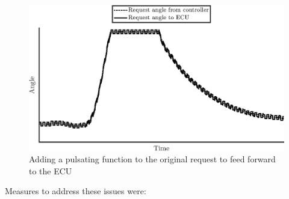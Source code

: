 \documentclass[root.tex]{subfiles}
\begin{document}
\begin{figure}[h!]
	
	\includegraphics[width=1\linewidth]{Request_with_pulse}
	\caption[Adding a pulsating function to the original request to feed forward to the ECU]{Adding a pulsating function to the original request to feed forward to the ECU}
	\label{fig:Request_with_pulse}
\end{figure}	
	
	Measures to address these issues were:
	
\end{document}
